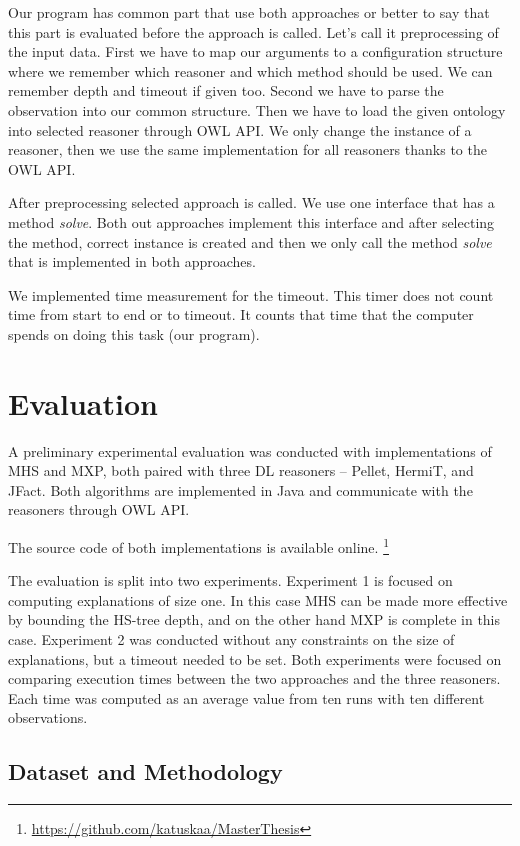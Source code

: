 \documentclass[12pt,a4paper]{article}
\begin{document}
Our program has common part that use both approaches or better to say that this part is evaluated before the approach is called. Let's call it preprocessing of the input data. First we have to map our arguments to a configuration structure where we remember which reasoner and which method should be used. We can remember depth and timeout if given too. Second we have to parse the observation into our common structure. Then we have to load the given ontology into selected reasoner through OWL API. We only change the instance of a reasoner, then we use the same implementation for all reasoners thanks to the OWL API.

After preprocessing selected approach is called. We use one interface that has a method \textit{solve}. Both out approaches implement this interface and after selecting the method, correct instance is created and then we only call the method \textit{solve} that is implemented in both approaches.

We implemented time measurement for the timeout. This timer does not count time from start to end or to timeout. It counts that time that the computer spends on doing this task (our program).

\section{Evaluation}

A preliminary experimental evaluation was conducted with implementations of
MHS and MXP, both paired with three  DL reasoners -- Pellet, HermiT, and
JFact. Both algorithms are implemented in Java and communicate with the
reasoners through OWL API.

The source code of both implementations is available online.
\footnote{\url{https://github.com/katuskaa/MasterThesis}}

The evaluation is split into two experiments. Experiment 1 is focused on
computing explanations of size one. In this case MHS can be
made more effective by bounding the HS-tree depth, and on the other hand
MXP is complete in this case. Experiment 2 was conducted without any
constraints on the size of explanations, but a timeout needed to be set. Both
experiments were focused on comparing execution times between the two
approaches and the three reasoners. Each time was computed as an average
value from ten runs with ten different observations.

\subsection{Dataset and Methodology}
\end{document}
